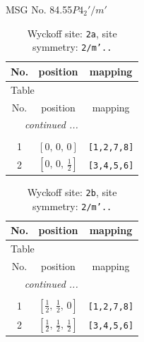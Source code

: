 \documentclass[fleqn,8pt]{jsarticle}
\begin{document}
\setcounter{MaxMatrixCols}{32}

\renewcommand{\tablename}{Table~}
\renewcommand{\figurename}{Figure~}
\begin{center}
\LARGE
MSG No. 84.55\quad$P4_{2}'/m'$
\end{center}
\renewcommand{\arraystretch}{1.2}
\begin{longtable}{ccc}
\caption{Wyckoff site: {\tt 2a}, site symmetry: {\tt 2/m'..}}
 \\
 \hline \hline
No. & position & mapping \\ \hline \endfirsthead

\multicolumn{2}{l}{\tablename\ \thetable{}} \\
 \hline \hline
No. & position & mapping \\ \hline \endhead

 \hline \hline
\multicolumn{2}{r}{\footnotesize\it continued ...} \\ \endfoot

 \hline \hline
\multicolumn{2}{r}{} \\ \endlastfoot

1 & $\left[ 0,\, 0,\, 0 \right]$ & {\tt [1,2,7,8]} \\ \hline
2 & $\left[ 0,\, 0,\, \frac{1}{2} \right]$ & {\tt [3,4,5,6]} \\
\end{longtable}
\renewcommand{\arraystretch}{1.2}
\begin{longtable}{ccc}
\caption{Wyckoff site: {\tt 2b}, site symmetry: {\tt 2/m'..}}
 \\
 \hline \hline
No. & position & mapping \\ \hline \endfirsthead

\multicolumn{2}{l}{\tablename\ \thetable{}} \\
 \hline \hline
No. & position & mapping \\ \hline \endhead

 \hline \hline
\multicolumn{2}{r}{\footnotesize\it continued ...} \\ \endfoot

 \hline \hline
\multicolumn{2}{r}{} \\ \endlastfoot

1 & $\left[ \frac{1}{2},\, \frac{1}{2},\, 0 \right]$ & {\tt [1,2,7,8]} \\ \hline
2 & $\left[ \frac{1}{2},\, \frac{1}{2},\, \frac{1}{2} \right]$ & {\tt [3,4,5,6]} \\
\end{longtable}
\end{document}
